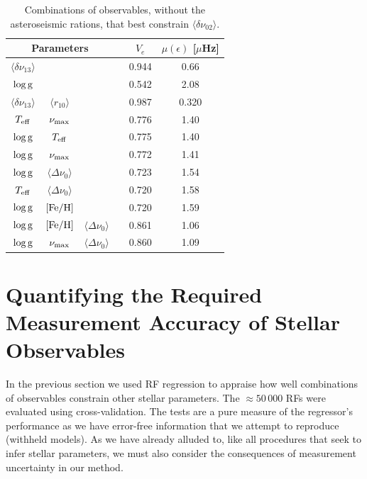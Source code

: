\begin{table}
\centering
\caption{Combinations of observables, without the asteroseismic rations, that best constrain $\langle\delta\nu_{02}\rangle$.}
    \begin{tabular}{cccccc}
    \hline
\multicolumn{3}{c}{Parameters} && $V_e$ & $\mu (\epsilon)$ [$\mu$Hz] \\ \hline \hline
$\langle\delta\nu_{13}\rangle$ &  &   &&0.944 & 0.66 \\ 
$\log \rm{g}$ &  &   &&0.542 & 2.08 \\ 
$\langle\delta\nu_{13}\rangle$ &  $\langle r_{10}\rangle$  &   &&0.987 & 0.320 \\ 
$T_{\rm{eff}}$     & $\nu_{\rm{max}}$&     &&0.776  & 1.40\\
$\log \rm{g}$     &  $T_{\rm{eff}}$&                 & &0.775  & 1.40\\
$\log \rm{g}$     &$\nu_{\rm{max}}$ &               &&0.772  & 1.41\\
$\log \rm{g}$     &$\langle\Delta\nu_0\rangle$ &               &&0.723  & 1.54\\
$T_{\rm{eff}}$     & $\langle\Delta\nu_0\rangle$&     &&0.720  & 1.58\\
$\log \rm{g}$ & $[\rm{Fe/H}]$ &  && 0.720 & 1.59 \\
$\log \rm{g}$ & $[\rm{Fe/H}]$ & $\langle\Delta\nu_0\rangle$ && 0.861 & 1.06 \\
$\log \rm{g}$ & $\nu_{\rm{max}}$ & $\langle\Delta\nu_0\rangle$ && 0.860 & 1.09 \\
\hline
    \end{tabular}
    \label{tab:d02}
\end{table}




\section{Quantifying the Required Measurement Accuracy of Stellar Observables}
\label{sec:accu}
In the previous section we used RF regression to appraise how well combinations of observables constrain other stellar parameters. The $\approx 50\,000$ RFs were   
evaluated using cross-validation. The tests are a pure measure of the regressor's performance as we have error-free information that we attempt to reproduce (withheld models).
 As we have already alluded to, like all procedures that seek to infer stellar parameters, we must also consider the consequences of measurement uncertainty in our method. 


